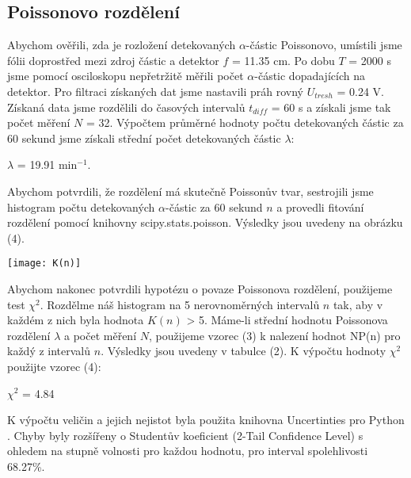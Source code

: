 \documentclass[a4paper,11pt]{article}
\begin{document}
    \hspace{10pt}
    \begin{minipage}[t]{0.5\textwidth} 
            \subsection{Poissonovo rozdělení}
                Abychom ověřili, zda je rozložení detekovaných $\alpha$-částic Poissonovo, umístili jsme fólii doprostřed mezi zdroj částic a detektor $f$ = 11.35 cm. Po dobu $T$ = 2000 s jsme pomocí osciloskopu nepřetržitě měřili počet $\alpha$-částic dopadajících na detektor. Pro filtraci získaných dat jsme nastavili práh rovný $U_{tresh}$ = 0.24 V. 
                Získaná data jsme rozdělili do časových intervalů $t_{diff}$ = 60 s a získali jsme tak počet měření $N$ = 32. Výpočtem průměrné hodnoty počtu detekovaných částic za 60 sekund jsme získali střední počet detekovaných částic $\lambda$:
                \begin{center}
                    $\lambda$ = 19.91 min$^{-1}$. 
                \end{center}
                Abychom potvrdili, že rozdělení má skutečně Poissonův tvar, sestrojili jsme histogram počtu detekovaných $\alpha$-částic za 60 sekund $n$ a provedli fitování rozdělení pomocí knihovny scipy.stats.poisson. Výsledky jsou uvedeny na obrázku (4).

                \vspace{10pt}   
                \par \centering
                \texttt{[image: K(n)]}
                \captionsetup{justification=centering, font=footnotesize}
                \label{fig:K(n)}
                \vspace{10pt}
                \raggedright 

                \par Abychom nakonec potvrdili hypotézu o povaze Poissonova rozdělení, použijeme test $\chi^2$. Rozdělme náš histogram na 5 nerovnoměrných intervalů $n$ tak, aby v každém z nich byla hodnota $K(n)$ > 5. Máme-li střední hodnotu Poissonova rozdělení $\lambda$ a počet měření $N$, použijeme vzorec (3) k nalezení hodnot NP(n) pro každý z intervalů $n$. Výsledky jsou uvedeny v tabulce (2). K výpočtu hodnoty $\chi^2$ použijte vzorec (4):
                \begin{center}
                    $\chi^2$ = 4.84
                \end{center}
                \vspace{10pt}
                \par K výpočtu veličin a jejich nejistot byla použita knihovna Uncertinties pro Python \cite{uncertainties}. Chyby byly rozšířeny o Studentův koeficient (2-Tail Confidence Level) s ohledem na stupně volnosti pro každou hodnotu, pro interval spolehlivosti 68.27\%.
    \end{minipage}
\newpage
\end{document}
